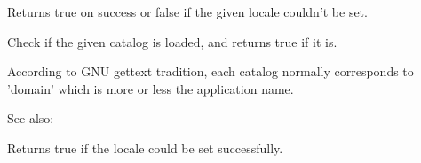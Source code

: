 Returns true on success or false if the given locale couldn't be set.

\label{wxlocaleisloaded}


Check if the given catalog is loaded, and returns true if it is.

According to GNU gettext tradition, each catalog
normally corresponds to 'domain' which is more or less the application name.

See also: 

\label{wxlocaleisok}


Returns true if the locale could be set successfully.

